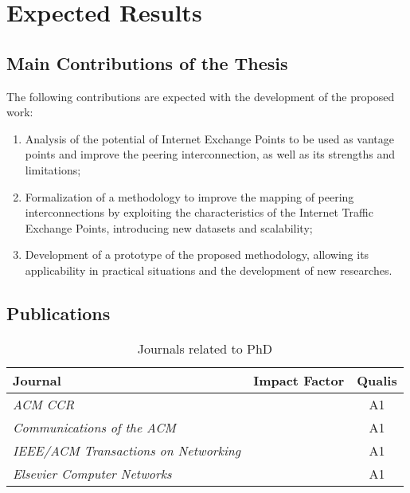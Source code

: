 \chapter{Expected Results}\label{cap:expected-results}
\thispagestyle{empty}

	\section{Main Contributions of the Thesis}\label{cap:contributions}
	\thispagestyle{empty}

	The following contributions are expected with the development of the proposed work:

	\begin{enumerate}
    \item Analysis of the potential of Internet Exchange Points to be used as vantage points and improve the peering interconnection, as well as its strengths and limitations;

    \item Formalization of a methodology to improve the mapping of peering interconnections by exploiting the characteristics of the Internet Traffic Exchange Points, introducing new datasets and scalability;

    \item Development of a prototype of the proposed methodology, allowing its applicability in practical situations and the development of new researches.
    \end{enumerate}


	\section{Publications}
	\label{sec:publications}

	\begin{table}[htp]
	\centering
	\begin{tabularx}{\textwidth}{l | c | c}
	\hline \hline
	{\bf Journal}                                           & {\bf Impact Factor} & \textbf{Qualis} \\ \hline
	\textit{ACM CCR}                					      &                   & A1 \\ \hline
    \textit{Communications of the ACM}                        &                   & A1 \\ \hline
	\textit{IEEE/ACM Transactions on Networking}              &                   & A1 \\ \hline
	\textit{Elsevier Computer Networks}                       &                   & A1 \\ \hline
	

	\hline
	\end{tabularx}
	\caption{Journals related to PhD}
	\label{tbl:journals}
	\end{table}

